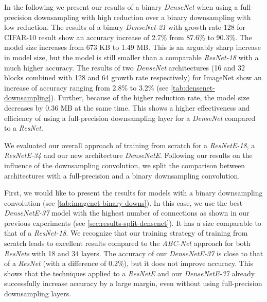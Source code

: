 \documentclass[10pt,twocolumn,letterpaper]{article}
\newcommand{\arch}[1]{\emph{#1}}
\begin{document}
In the following we present our results of a binary \arch{DenseNet} when using a full-precision downsampling with high reduction over a binary downsampling with low reduction.
The results of a binary \arch{DenseNet-21} with growth rate 128 for CIFAR-10 result show an accuracy increase of 2.7\% from 87.6\% to 90.3\%.
The model size increases from 673 KB to 1.49 MB.
This is an arguably sharp increase in model size, but the model is still smaller than a comparable \arch{ResNet-18} with a much higher accuracy.
The results of two \arch{DenseNet} architectures (16 and 32 blocks combined with 128 and 64 growth rate respectively) for ImageNet show an increase of accuracy ranging from 2.8\% to 3.2\% (see \autoref{tab:densenet-downsampling}).
Further, because of the higher reduction rate, the model size decreases by 0.36 MB at the same time.
This shows a higher effectiveness and efficiency of using a full-precision downsampling layer for a \arch{DenseNet} compared to a \arch{ResNet}.

We evaluated our overall approach of training from scratch for a \arch{ResNetE-18}, a \arch{ResNetE-34} and our new architecture \arch{DenseNetE}.
Following our results on the influence of the downsampling convolution, we split the comparison between architectures with a full-precision and a binary downsampling convolution.

First, we would like to present the results for models with a binary downsampling convolution (see \autoref{tab:imagenet-binary-downs}).
In this case, we use the best \arch{DenseNetE-37} model with the highest number of connections as shown in our previous experiments (see \autoref{sec:results-split-densenet}).
It has a size comparable to that of a \arch{ResNet-18}.
We recognize that our training strategy of training from scratch leads to excellent results compared to the \arch{ABC-Net}\cite{lin2017towards} approach for both \arch{ResNets} with 18 and 34 layers.
The accuracy of our \arch{DenseNetE-37} is close to that of a \arch{ResNet} (with a difference of 0.2\%), but it does not improve accuracy.
This shows that the techniques applied to a \arch{ResNetE} and our \arch{DenseNetE-37} already successfully increase accuracy by a large margin, even without using full-precision downsampling layers.
\end{document}
